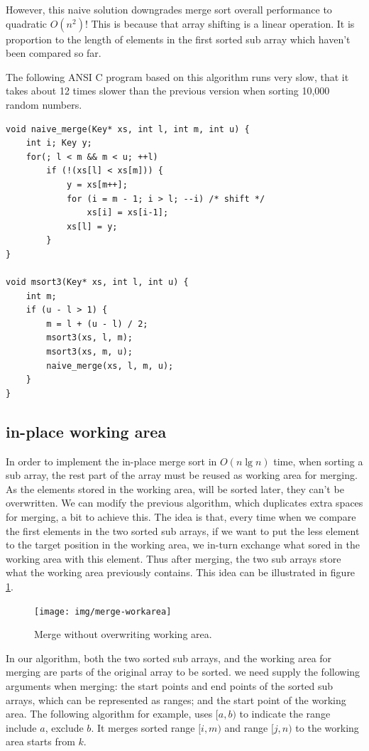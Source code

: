\documentclass[b5paper]{article}
\begin{document}
However, this naive solution downgrades merge sort overall performance to quadratic $O(n^2)$! This is because
that array shifting is a linear operation. It is proportion to the length of elements in
the first sorted sub array which haven't been compared so far.

The following ANSI C program based on this algorithm runs very slow, that it takes about 12 times slower than
the previous version when sorting 10,000 random numbers.

\lstset{language=C}
\begin{lstlisting}
void naive_merge(Key* xs, int l, int m, int u) {
    int i; Key y;
    for(; l < m && m < u; ++l)
        if (!(xs[l] < xs[m])) {
            y = xs[m++];
            for (i = m - 1; i > l; --i) /* shift */
                xs[i] = xs[i-1];
            xs[l] = y;
        }
}

void msort3(Key* xs, int l, int u) {
    int m;
    if (u - l > 1) {
        m = l + (u - l) / 2;
        msort3(xs, l, m);
        msort3(xs, m, u);
        naive_merge(xs, l, m, u);
    }
}
\end{lstlisting}

\subsection{in-place working area}
In order to implement the in-place merge sort in $O(n \lg n)$ time, when sorting a sub array, the rest part of
the array must be reused as working area for merging. As the elements stored in the working area, will be sorted
later, they can't be overwritten. We can modify the previous algorithm, which duplicates extra spaces for merging,
a bit to achieve this. The idea is that, every time when we compare the first elements in the two sorted sub
arrays, if we want to put the less element to the target position in the working area, we in-turn exchange what
sored in the working area with this element. Thus after merging, the two sub arrays store what the working area
previously contains. This idea can be illustrated in figure \ref{fig:merge-workarea}.

\begin{figure}[htbp]
 \centering
 \texttt{[image: img/merge-workarea]}
 \caption{Merge without overwriting working area.}
 \label{fig:merge-workarea}
\end{figure}

In our algorithm, both the two sorted sub arrays, and the working area for merging are parts of the
original array to be sorted. we need supply the following arguments when merging: the start points and end
points of the sorted sub arrays, which can be represented as ranges; and the start point of the working
area. The following algorithm for example, uses $[a, b)$ to indicate the range include $a$,
exclude $b$. It merges sorted range $[i, m)$ and range $[j, n)$ to the working area starts from $k$.
\end{document}
